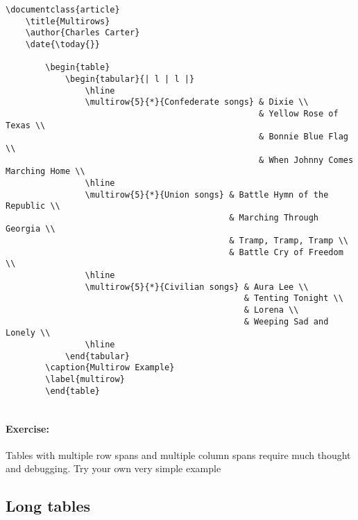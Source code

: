        \begin{verbatim}
\documentclass{article}
    \title{Multirows}
    \author{Charles Carter}
    \date{\today{}}
 
        \begin{table}
            \begin{tabular}{| l | l |}
                \hline
                \multirow{5}{*}{Confederate songs} & Dixie \\
                                                   & Yellow Rose of Texas \\
                                                   & Bonnie Blue Flag \\
                                                   & When Johnny Comes Marching Home \\
                \hline
                \multirow{5}{*}{Union songs} & Battle Hymn of the Republic \\
                                             & Marching Through Georgia \\
                                             & Tramp, Tramp, Tramp \\
                                             & Battle Cry of Freedom \\
                \hline
                \multirow{5}{*}{Civilian songs} & Aura Lee \\
                                                & Tenting Tonight \\
                                                & Lorena \\
                                                & Weeping Sad and Lonely \\
                \hline
            \end{tabular}
        \caption{Multirow Example}
        \label{multirow}
        \end{table}
    
        \end{verbatim}

        \paragraph{Exercise:} Tables with multiple row spans and multiple column spans require much thought and debugging. Try your own very simple example

        \subsection{Long tables}
        \label{Long tables}
        
